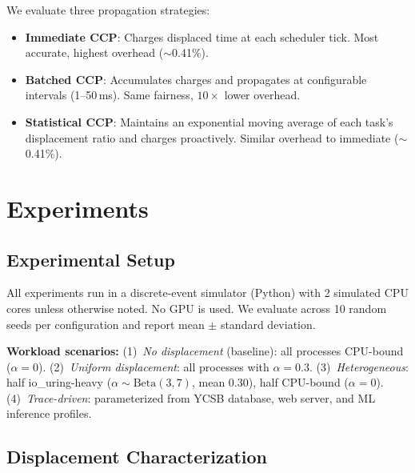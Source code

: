 \documentclass{article}
\newcommand{\displacement}{\alpha}
\begin{document}
We evaluate three propagation strategies:
\begin{itemize}
    \item \textbf{Immediate CCP}: Charges displaced time at each scheduler tick. Most accurate, highest overhead ($\sim$0.41\%).
    \item \textbf{Batched CCP}: Accumulates charges and propagates at configurable intervals (1--50\,ms). Same fairness, $10\times$ lower overhead.
    \item \textbf{Statistical CCP}: Maintains an exponential moving average of each task's displacement ratio and charges proactively. Similar overhead to immediate ($\sim$0.41\%).
\end{itemize}

\section{Experiments}
\label{sec:experiments}

\subsection{Experimental Setup}

All experiments run in a discrete-event simulator (Python) with 2 simulated CPU cores unless otherwise noted. No GPU is used. We evaluate across 10 random seeds per configuration and report mean $\pm$ standard deviation.

\textbf{Workload scenarios:}
(1)~\emph{No displacement} (baseline): all processes CPU-bound ($\displacement = 0$).
(2)~\emph{Uniform displacement}: all processes with $\displacement = 0.3$.
(3)~\emph{Heterogeneous}: half io\_uring-heavy ($\displacement \sim \text{Beta}(3,7)$, mean 0.30), half CPU-bound ($\displacement = 0$).
(4)~\emph{Trace-driven}: parameterized from YCSB database, web server, and ML inference profiles.

\subsection{Displacement Characterization}
\end{document}
